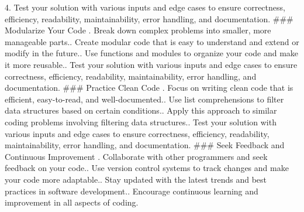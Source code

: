 \documentclass[10pt,a4paper,twocolumn]{article}
\begin{document}
\begin{appendices}
\begin{tt}
4. Test your solution with various inputs and edge cases to ensure correctness, efficiency, readability, maintainability, error handling, and documentation.\newline
\newline
\#\#\# Modularize Your Code\newline
{}. Break down complex problems into smaller, more manageable parts.. Create modular code that is easy to understand and extend or modify in the future.. Use functions and modules to organize your code and make it more reusable.. Test your solution with various inputs and edge cases to ensure correctness, efficiency, readability, maintainability, error handling, and documentation.\newline
\newline
\#\#\# Practice Clean Code\newline
{}. Focus on writing clean code that is efficient, easy-to-read, and well-documented.. Use list comprehensions to filter data structures based on certain conditions.. Apply this approach to similar coding problems involving filtering data structures.. Test your solution with various inputs and edge cases to ensure correctness, efficiency, readability, maintainability, error handling, and documentation.\newline
\newline
\#\#\# Seek Feedback and Continuous Improvement\newline
{}. Collaborate with other programmers and seek feedback on your code.. Use version control systems to track changes and make your code more adaptable.. Stay updated with the latest trends and best practices in software development.. Encourage continuous learning and improvement in all aspects of coding.\newline
\end{tt}

\end{appendices}
\end{document}

